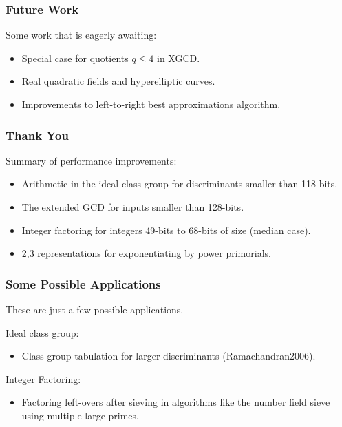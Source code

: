 \documentclass{beamer}
\begin{document}

\begin{frame}
\frametitle{Future Work}
Some work that is eagerly awaiting:
\begin{itemize}
\item Special case for quotients $q \le 4$ in XGCD.
\item Real quadratic fields and hyperelliptic curves.
\item Improvements to left-to-right best approximations algorithm.
\end{itemize}
\end{frame}

\begin{frame}
\frametitle{Thank You}
Summary of performance improvements:
\begin{itemize}
\item Arithmetic in the ideal class group for discriminants smaller than 118-bits.
\item The extended GCD for inputs smaller than 128-bits.
\item Integer factoring for integers 49-bits to 68-bits of size (median case).
\item 2,3 representations for exponentiating by power primorials.
\end{itemize}
\end{frame}



\begin{frame}
\end{frame}
\begin{frame}
\end{frame}
\begin{frame}
\end{frame}

\begin{frame}
\frametitle{Some Possible Applications}
These are just a few possible applications. \bigskip

Ideal class group:
\begin{itemize}
\item Class group tabulation for larger discriminants \break (Ramachandran2006).
\end{itemize}

\bigskip
Integer Factoring:
\begin{itemize}
\item Factoring left-overs after sieving in algorithms like the number field sieve using multiple large primes.
\end{itemize}

\end{frame}
\end{document}
